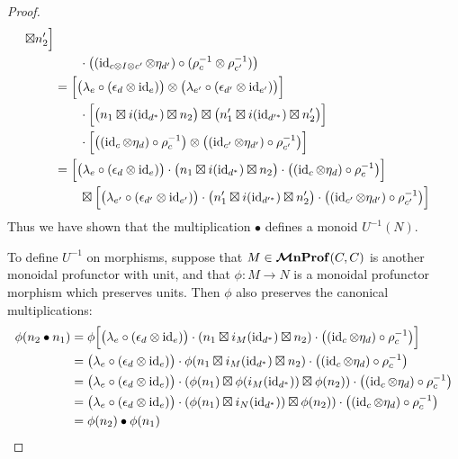 \documentclass[11pt,oneside,article]{memoir}
\begin{document}
\begin{proof}
\begin{align*}
            \boxtimes n'_2\Bigr] \\
      &\qquad \cdot \bigl((\operatorname{id}_{c\otimes I\otimes c'}\otimes\eta_{d'})
            \circ (\rho_c^{-1}\otimes \rho_{c'}^{-1})\bigr) \\
      &= \Bigl[\bigl(\lambda_e\circ(\epsilon_d\otimes\operatorname{id}_e)\bigr)
            \otimes \bigl(\lambda_{e'}\circ(\epsilon_{d'}\otimes\operatorname{id}_{e'})\bigr)\Bigr] \\
      &\qquad \cdot \Bigl[\bigl(n_1\boxtimes i(\operatorname{id}_{d^*})\boxtimes n_2\bigr)
            \boxtimes \bigl(n'_1\boxtimes i(\operatorname{id}_{d'^*})\boxtimes n'_2\bigr)\Bigr] \\
      &\qquad \cdot\Bigl[\bigl((\operatorname{id}_c\otimes\eta_d)\circ \rho_c^{-1}\bigr)
            \otimes \bigl((\operatorname{id}_{c'}\otimes\eta_{d'})\circ \rho_{c'}^{-1}\bigr)\Bigr] \\
      &= \Bigl[\bigl(\lambda_e\circ(\epsilon_d\otimes\operatorname{id}_e)\bigr)
            \cdot \bigl(n_1\boxtimes i(\operatorname{id}_{d^*})\boxtimes n_2\bigr)
            \cdot \bigl((\operatorname{id}_c\otimes\eta_d)\circ \rho_c^{-1}\bigr)\Bigr] \\
      &\qquad \boxtimes \Bigl[\bigl(\lambda_{e'}\circ(\epsilon_{d'}\otimes\operatorname{id}_{e'})\bigr)
            \cdot \bigl(n'_1\boxtimes i(\operatorname{id}_{d'^*})\boxtimes n'_2\bigr)
            \cdot \bigl((\operatorname{id}_{c'}\otimes\eta_{d'})\circ \rho_{c'}^{-1}\bigr)\Bigr]
   \end{align*}
   Thus we have shown that the multiplication $\bullet$ defines a monoid $U^{-1}(N)$.

   To define $U^{-1}$ on morphisms, suppose that $M\in\bm{\mathcal{M}}\mathbf{nProf}(C, C)$ is another monoidal profunctor
   with unit, and that $\phi\colon M\to N$ is a monoidal profunctor morphism which preserves units.
   Then $\phi$ also preserves the canonical multiplications:
   \begin{align*}
      \phi(n_2\bullet n_1) &=
      \phi\Bigl[\bigl(\lambda_e\circ(\epsilon_d\otimes\operatorname{id}_e)\bigr)\cdot(n_1\boxtimes
      i_M(\operatorname{id}_{d^*})\boxtimes n_2)\cdot\bigl((\operatorname{id}_c\otimes \eta_d)\circ \rho_c^{-1}\bigr)\Bigr] \\
      &= \bigl(\lambda_e\circ(\epsilon_d\otimes\operatorname{id}_e)\bigr)\cdot\phi(n_1\boxtimes
   i_M(\operatorname{id}_{d^*})\boxtimes n_2)\cdot\bigl((\operatorname{id}_c\otimes \eta_d)\circ \rho_c^{-1}\bigr) \\
      &= \bigl(\lambda_e\circ(\epsilon_d\otimes\operatorname{id}_e)\bigr)\cdot(\phi(n_1)\boxtimes
\phi(i_M(\operatorname{id}_{d^*}))\boxtimes \phi(n_2))\cdot\bigl((\operatorname{id}_c\otimes \eta_d)\circ \rho_c^{-1}\bigr) \\
      &= \bigl(\lambda_e\circ(\epsilon_d\otimes\operatorname{id}_e)\bigr)\cdot(\phi(n_1)\boxtimes
      i_N(\operatorname{id}_{d^*}))\boxtimes \phi(n_2))\cdot\bigl((\operatorname{id}_c\otimes \eta_d)\circ \rho_c^{-1}\bigr) \\
      &= \phi(n_2)\bullet\phi(n_1)
   \end{align*}


\end{proof}
\end{document}
